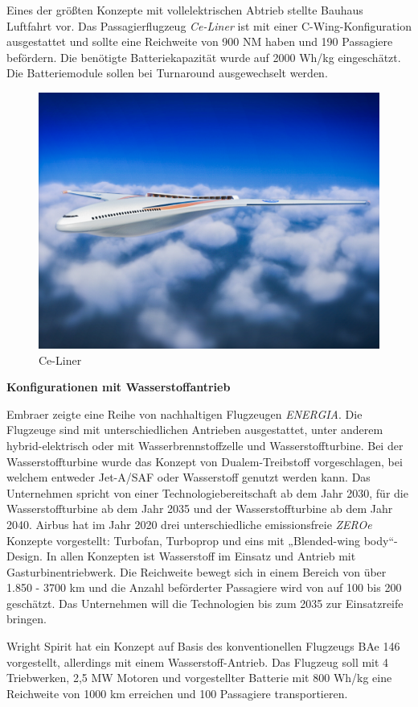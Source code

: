Eines der größten Konzepte mit vollelektrischen Abtrieb stellte Bauhaus Luftfahrt vor. 
Das Passagierflugzeug \textit{Ce-Liner} \cite{BauhausLuftfahrt} ist mit einer C-Wing-Konfiguration
ausgestattet und sollte eine Reichweite von 900 NM haben und 190 Passagiere befördern. 
Die benötigte Batteriekapazität wurde auf 2000 Wh/kg eingeschätzt. 
Die Batteriemodule sollen bei Turnaround ausgewechselt werden.
\begin{figure}[h]
	\centering
	\includegraphics[width=0.6\linewidth]{Bilder/NASA.jpg}
	\caption[NASA]{Ce-Liner \cite{NASA_N3X_2025} }
	\label{NASA_konfig}
\end{figure}

\textbf{Konfigurationen mit Wasserstoffantrieb}

Embraer zeigte eine Reihe von nachhaltigen Flugzeugen \textit{ENERGIA}. 
Die Flugzeuge sind mit unterschiedlichen Antrieben ausgestattet, 
unter anderem hybrid-elektrisch oder mit Wasserbrennstoffzelle und Wasserstoffturbine. 
Bei der Wasserstoffturbine wurde das Konzept von Dualem-Treibstoff vorgeschlagen, 
bei welchem entweder Jet-A/SAF oder Wasserstoff genutzt werden kann. 
Das Unternehmen spricht von einer Technologiebereitschaft ab dem Jahr 2030, 
für die Wasserstoffturbine ab dem Jahr 2035 und der Wasserstoffturbine ab dem Jahr 2040. \cite{embraer_energia_2021}
%
Airbus \cite{airbus_zea_concepts} hat im Jahr 2020 drei unterschiedliche 
emissionsfreie \textit{ZEROe} Konzepte vorgestellt: Turbofan, Turboprop und eins mit „Blended-wing body“-Design.
In allen Konzepten ist Wasserstoff im Einsatz und Antrieb mit Gasturbinentriebwerk. 
Die Reichweite bewegt sich in einem Bereich von über 1.850 - 3700 km 
und die Anzahl beförderter Passagiere wird von auf 100 bis 200 geschätzt. 
Das Unternehmen will die Technologien bis zum 2035 zur Einsatzreife bringen.

Wright Spirit \cite{wright_electric_website} hat ein Konzept auf Basis 
des konventionellen Flugzeugs BAe 146 vorgestellt, allerdings mit einem Wasserstoff-Antrieb.
Das Flugzeug soll mit 4 Triebwerken, 2,5 MW Motoren und vorgestellter Batterie 
mit 800 Wh/kg eine Reichweite von 1000 km erreichen und 100 Passagiere transportieren.

